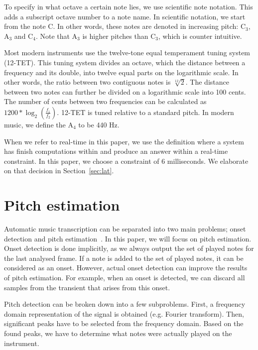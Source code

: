 \documentclass[10pt,twocolumn]{article}
\begin{document}
To specify in what octave a certain note lies, we use scientific note notation. This adds a subscript octave number to a note name. In scientific notation, we start from the note C. In other words, these notes are denoted in increasing pitch: $\text{C}_3$, $\text{A}_3$ and $\text{C}_4$. Note that $\text{A}_3$ is higher pitches than $\text{C}_3$, which is counter intuitive.

Most modern instruments use the twelve-tone equal temperament tuning system (12-TET). This tuning system divides an octave, which the distance between a frequency and its double, into twelve equal parts on the logarithmic scale. In other words, the ratio between two contiguous notes is $\sqrt[12]{2}$. The distance between two notes can further be divided on a logarithmic scale into 100 cents. The number of cents between two frequencies can be calculated as $1200 * \log_2(\frac{f_1}{f_2})$. 12-TET is tuned relative to a standard pitch. In modern music, we define the $\text{A}_4$ to be 440 Hz.

When we refer to real-time in this paper, we use the definition where a system has finish computations within and produce an answer within a real-time constraint. In this paper, we choose a constraint of 6 milliseconds. We elaborate on that decision in Section~\ref{sec:lat}.


\section{Pitch estimation}
Automatic music transcription can be separated into two main problems; onset detection and pitch estimation~\cite{survey2}. In this paper, we will focus on pitch estimation. Onset detection is done implicitly, as we always output the set of played notes for the last analysed frame. If a note is added to the set of played notes, it can be considered as an onset. However, actual onset detection can improve the results of pitch estimation. For example, when an onset is detected, we can discard all samples from the transient that arises from this onset.

Pitch detection can be broken down into a few subproblems. First, a frequency domain representation of the signal is obtained (e.g. Fourier transform). Then, significant peaks have to be selected from the frequency domain. Based on the found peaks, we have to determine what notes were actually played on the instrument.
\end{document}
